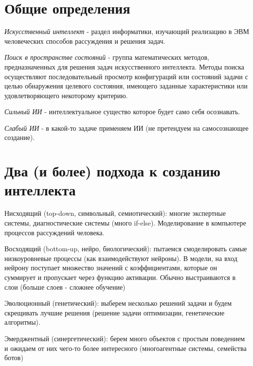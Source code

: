 \documentclass[12pt]{extarticle}
\begin{document}
\tableofcontents\newpage

\section{Общие определения}
\par\textit{Искусственный интеллект} - раздел
информатики, изучающий реализацию в ЭВМ человеческих способов рассуждения и
решения задач.

\par\textit{Поиск в пространстве состояний} - группа математических методов, предназначенных для решения задач
искусственного интеллекта. Методы поиска осуществляют последовательный просмотр
конфигураций или состояний задачи с целью обнаружения целевого состояния,
имеющего заданные характеристики или удовлетворяющего некоторому критерию.

\par\textit{Сильный ИИ} - интеллектуальное существо которое
будет само себя осознавать.

\par\textit{Слабый ИИ} - в какой-то задаче применяем ИИ (не
претендуем на самосознающее создание).

\section{Два (и более) подхода к созданию интеллекта}
\par Нисходящий (top-down, символьный, семиотический): многие экспертные
системы, диагностические системы (много if-else). Моделирование в компьютере
процессов рассуждений человека.
\par Восходящий (bottom-up, нейро, биологический): пытаемся смоделировать самые низкоуровневые процессы
(как взаимодействуют нейроны). В модели, на вход нейрону поступает множество
значений с коэффициентами, которые он суммирует и пропускает через функцию
активации. Обычно выстраиваются в слои (больше слоев - сложнее обучение)
\par Эволюционный (генетический): выберем несколько решений задачи и будем
скрещивать лучшие решения (решение задачи оптимизации, генетические алгоритмы).
\par Эмерджентный (синергетический): берем много объектов с простым поведением и
ожидаем от них чего-то более интересного (многоагентные системы, семейства
ботов)
\end{document}
